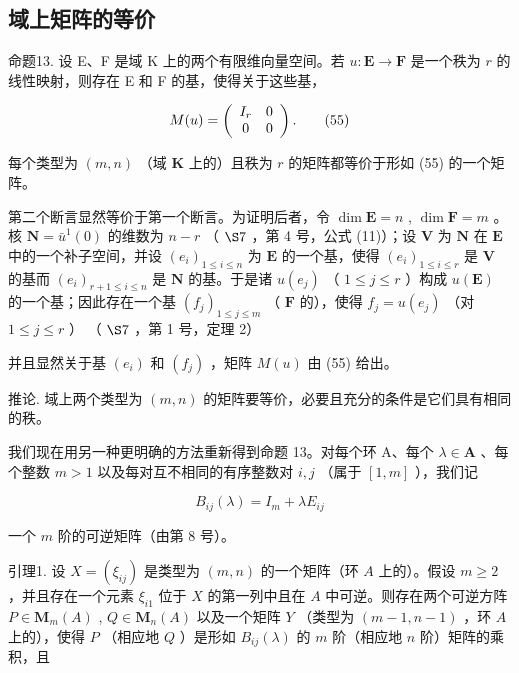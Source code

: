 \subsection{域上矩阵的等价}

命题13. 设 E、F 是域 K 上的两个有限维向量空间。若 \(u: \mathbf{E} \to \mathbf{F}\) 是一个秩为 \(r\) 的线性映射，则存在 E 和 F 的基，使得关于这些基，

\[
M (u) = \left( \begin{array}{c c} I _ {r} & 0 \\ 0 & 0 \end{array} \right).\tag{55}
\]

每个类型为 \((m, n)\) （域 \(\mathbf{K}\) 上的）且秩为 \(r\) 的矩阵都等价于形如 (55) 的一个矩阵。

第二个断言显然等价于第一个断言。为证明后者，令 \(\dim \mathbf{E} = n\) , \(\dim \mathbf{F} = m\) 。核 \(\mathbf{N} = \bar{u}^{1}(0)\) 的维数为 \(n - r\) （ \(\S 7\) ，第 4 号，公式 (11)）；设 \(\mathbf{V}\) 为 \(\mathbf{N}\) 在 \(\mathbf{E}\) 中的一个补子空间，并设 \((e_i)_{1 \leqslant i \leqslant n}\) 为 \(\mathbf{E}\) 的一个基，使得 \((e_i)_{1 \leqslant i \leqslant r}\) 是 \(\mathbf{V}\) 的基而 \((e_i)_{r + 1 \leqslant i \leqslant n}\) 是 \(\mathbf{N}\) 的基。于是诸 \(u(e_j)\) （ \(1 \leqslant j \leqslant r\) ）构成 \(u(\mathbf{E})\) 的一个基；因此存在一个基 \((f_j)_{1 \leqslant j \leqslant m}\) （ \(\mathbf{F}\) 的），使得 \(f_j = u(e_j)\) （对 \(1 \leqslant j \leqslant r\) ） （ \(\S 7\) ，第 1 号，定理 2）

并且显然关于基 \((e_{i})\) 和 \((f_{j})\) ，矩阵 \(M(u)\) 由 (55) 给出。

推论. 域上两个类型为 \((m, n)\) 的矩阵要等价，必要且充分的条件是它们具有相同的秩。

我们现在用另一种更明确的方法重新得到命题 13。对每个环 A、每个 \(\lambda \in \mathbf{A}\) 、每个整数 \(m > 1\) 以及每对互不相同的有序整数对 \(i, j\) （属于 \([1, m]\) ），我们记

\[
B _ {i j} (\lambda) = I _ {m} + \lambda E _ {i j}\tag{56}
\]

一个 \(m\) 阶的可逆矩阵（由第 8 号）。

引理1. 设 \(X = (\xi_{ij})\) 是类型为 \((m, n)\) 的一个矩阵（环 \(A\) 上的）。假设 \(m \geqslant 2\) ，并且存在一个元素 \(\xi_{i1}\) 位于 \(X\) 的第一列中且在 \(A\) 中可逆。则存在两个可逆方阵 \(P \in \mathbf{M}_m(A)\) , \(Q \in \mathbf{M}_n(A)\) 以及一个矩阵 \(Y\) （类型为 \((m - 1, n - 1)\) ，环 \(A\) 上的），使得 \(P\) （相应地 \(Q\) ）是形如 \(B_{ij}(\lambda)\) 的 \(m\) 阶（相应地 \(n\) 阶）矩阵的乘积，且

